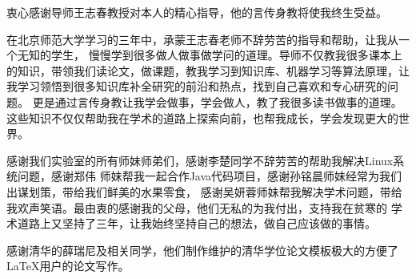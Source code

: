 
\begin{ack}
  衷心感谢导师王志春教授对本人的精心指导，他的言传身教将使我终生受益。

  在北京师范大学学习的三年中，承蒙王志春老师不辞劳苦的指导和帮助，让我从一个无知的学生，
  慢慢学到很多做人做事做学问的道理。导师不仅教我很多课本上的知识，带领我们读论文，做课题，教我学习到知识库、机器学习等算法原理，让我学习领悟到很多知识库补全研究的前沿和热点，找到自己喜欢和专心研究的问题。
  更是通过言传身教让我学会做事，学会做人，教了我很多读书做事的道理。
  这些知识不仅仅帮助我在学术的道路上探索向前，也帮我成长，学会发现更大的世界。

  感谢我们实验室的所有师妹师弟们，感谢李楚同学不辞劳苦的帮助我解决Linux系统问题，感谢郑伟
  师妹帮我一起合作Java代码项目，感谢孙铭晨师妹经常为我们出谋划策，带给我们鲜美的水果零食，
  感谢吴妍蓉师妹帮我解决学术问题，带给我欢声笑语。最由衷的感谢我的父母，他们无私的为我付出，支持我在贫寒的
  学术道路上又坚持了三年，让我始终坚持自己的想法，做自己应该做的事情。

  感谢清华的薛瑞尼及相关同学，他们制作维护的清华学位论文模板极大的方便了\LaTeX{}用户的论文写作。


\end{ack}

